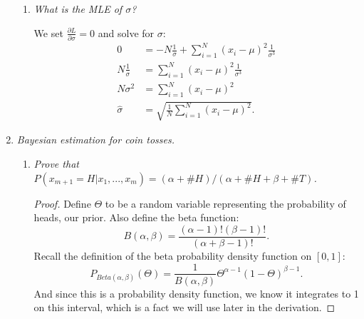 \documentclass[12pt,oneside,reqno]{amsart}
\theoremstyle{plain}
\theoremstyle{definition}
\theoremstyle{remark}
\newcommand{\bb}{\vspace{3mm}}
\newcommand{\bee}{\begin{equation}\begin{aligned}}
\newcommand{\eee}{\end{aligned}\end{equation}}
\newcommand{\fracc}{\frac}
\begin{document}
\begin{enumerate}[label=\arabic*.]
\begin{enumerate}
\item \textit{What is the MLE of $\sigma$?}

\bb
We set $\fracc{\partial L}{\partial \sigma} = 0$ and solve for $\sigma$:
\bee
0 &=  -N \fracc{1}{\sigma}  + \sum_{i = 1}^N (x_i - \mu)^2 \fracc{1}{\sigma^{3}}\\
N \fracc{1}{\sigma} &= \sum_{i = 1}^N (x_i - \mu)^2 \fracc{1}{\sigma^{3}}\\
N\sigma^2 &= \sum_{i = 1}^N (x_i - \mu)^2\\
\hat{\sigma} &= \sqrt{\fracc{1}{N}\sum_{i = 1}^N (x_i - \mu)^2}. 
\eee
\end{enumerate}
\bb
\item \textit{Bayesian estimation for coin tosses. }
\bb
\begin{enumerate}
\item \textit{Prove that $P(x_{m + 1} = H|x_1,...,x_m) = (\alpha + \#H)/(\alpha + \#H + \beta + \#T)$. }
\bb
\begin{proof}
Define $\Theta$ to be a random variable representing the probability of heads, our prior. Also define the beta function:
$$
B(\alpha,\beta)  = \fracc{(\alpha - 1)!(\beta - 1)!}{(\alpha + \beta - 1)!}.
$$ 
Recall the definition of the beta probability density function on $[0,1]$:
$$
P_{Beta(\alpha,\beta)}(\Theta) = \fracc{1}{B(\alpha,\beta)}\Theta^{\alpha -1}(1 - \Theta)^{\beta - 1}.
$$
And since this is a probability density function, we know it integrates to 1 on this interval, which is a fact we will use later in the derivation. 


\end{proof}
\end{enumerate}
\end{enumerate}
\end{document}
